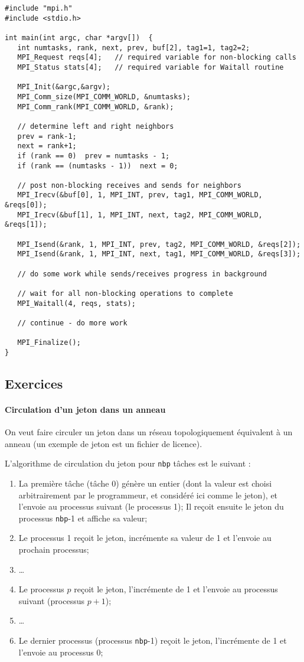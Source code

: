 \documentclass[11pt,a4paper]{article}
\begin{document}
\begin{lstlisting}[style=customcpp]
#include "mpi.h"
#include <stdio.h>

int main(int argc, char *argv[])  {
   int numtasks, rank, next, prev, buf[2], tag1=1, tag2=2;
   MPI_Request reqs[4];   // required variable for non-blocking calls
   MPI_Status stats[4];   // required variable for Waitall routine

   MPI_Init(&argc,&argv);
   MPI_Comm_size(MPI_COMM_WORLD, &numtasks);
   MPI_Comm_rank(MPI_COMM_WORLD, &rank);
   
   // determine left and right neighbors
   prev = rank-1;
   next = rank+1;
   if (rank == 0)  prev = numtasks - 1;
   if (rank == (numtasks - 1))  next = 0;

   // post non-blocking receives and sends for neighbors
   MPI_Irecv(&buf[0], 1, MPI_INT, prev, tag1, MPI_COMM_WORLD, &reqs[0]);
   MPI_Irecv(&buf[1], 1, MPI_INT, next, tag2, MPI_COMM_WORLD, &reqs[1]);

   MPI_Isend(&rank, 1, MPI_INT, prev, tag2, MPI_COMM_WORLD, &reqs[2]);
   MPI_Isend(&rank, 1, MPI_INT, next, tag1, MPI_COMM_WORLD, &reqs[3]);
  
   // do some work while sends/receives progress in background

   // wait for all non-blocking operations to complete
   MPI_Waitall(4, reqs, stats);
  
   // continue - do more work

   MPI_Finalize();
}
\end{lstlisting}

\subsection{Exercices}

\paragraph{Circulation d'un jeton dans un anneau}

On veut faire circuler un jeton dans un réseau topologiquement équivalent
à un anneau (un exemple de jeton est un fichier de licence).

L'algorithme de circulation du jeton pour \texttt{nbp} tâches est le suivant :
\begin{enumerate}
\item La première tâche (tâche 0) génère un entier (dont la valeur est choisi arbitrairement par le
  programmeur, et considéré ici comme le jeton), et l'envoie au processus suivant (le processus 1);
  Il reçoit ensuite le jeton du processus \texttt{nbp}-1 et affiche sa valeur;
\item Le processus 1 reçoit le jeton, incrémente sa valeur de 1 et l'envoie au prochain processus;
\item \ldots
\item Le processus $p$ reçoit le jeton, l'incrémente de 1 et l'envoie au processus suivant
(processus $p+1$);
\item \ldots
\item Le dernier processus (processus \texttt{nbp}-1) reçoit le jeton, l'incrémente de 1 et
  l'envoie au processus 0;
\end{enumerate}
\end{document}
